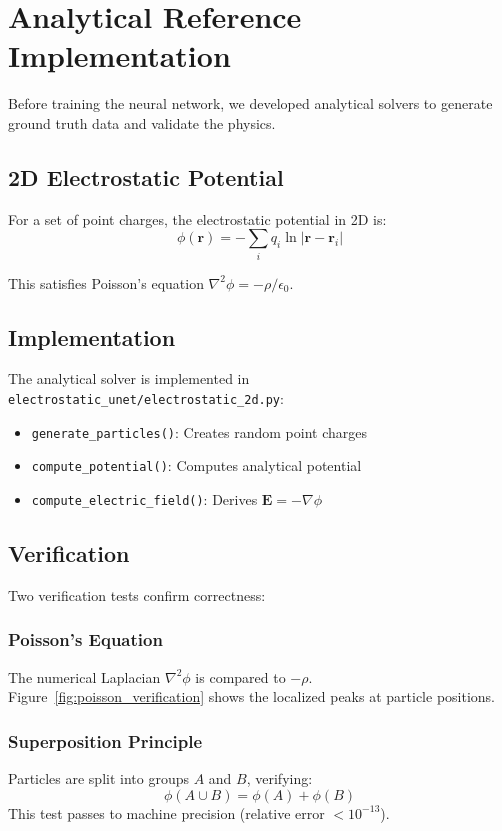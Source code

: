 \documentclass[11pt,a4paper]{article}
\begin{document}
\section{Analytical Reference Implementation}

Before training the neural network, we developed analytical solvers to generate ground truth data and validate the physics.

\subsection{2D Electrostatic Potential}

For a set of point charges, the electrostatic potential in 2D is:
\begin{equation}
    \phi(\mathbf{r}) = -\sum_i q_i \ln|\mathbf{r} - \mathbf{r}_i|
\end{equation}

This satisfies Poisson's equation $\nabla^2 \phi = -\rho/\epsilon_0$.

\subsection{Implementation}

The analytical solver is implemented in \texttt{electrostatic\_unet/electrostatic\_2d.py}:
\begin{itemize}
    \item \texttt{generate\_particles()}: Creates random point charges
    \item \texttt{compute\_potential()}: Computes analytical potential
    \item \texttt{compute\_electric\_field()}: Derives $\mathbf{E} = -\nabla\phi$
\end{itemize}

\subsection{Verification}

Two verification tests confirm correctness:

\subsubsection{Poisson's Equation}
The numerical Laplacian $\nabla^2\phi$ is compared to $-\rho$. Figure~\ref{fig:poisson_verification} shows the localized peaks at particle positions.

\subsubsection{Superposition Principle}
Particles are split into groups $A$ and $B$, verifying:
\begin{equation}
    \phi(A \cup B) = \phi(A) + \phi(B)
\end{equation}
This test passes to machine precision (relative error $< 10^{-13}$).
\end{document}

